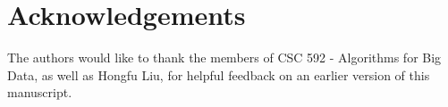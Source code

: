 \section{Acknowledgements}
\label{sec:acknowledgements}


The authors would like to thank the members of CSC 592 - Algorithms for Big Data, as well as Hongfu Liu, for helpful feedback on an earlier version of this manuscript.
